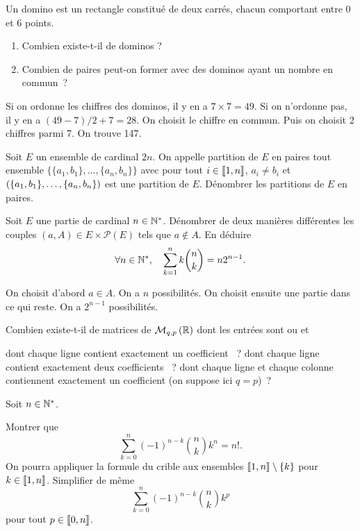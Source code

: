 \documentclass{magnolia}
\begin{document}
Un domino est un rectangle constitué de deux carrés, chacun comportant entre 0 et 6 points. 
\begin{enumerate}
\item Combien existe-t-il de dominos ?
\item Combien de paires peut-on former avec des dominos ayant un nombre en commun~?
\end{enumerate}
\begin{sol}
\begin{questions}
\question Si on ordonne les chiffres des dominos, il y en a $7\times 7=49$. Si on n'ordonne pas, il y en a $(49-7)/2+7=28$.
\question On choisit le chiffre en commun. Puis on choisit 2 chiffres parmi 7. On trouve 147.
\end{questions}
\end{sol}


Soit $E$ un ensemble de cardinal $2n$. On appelle partition de $E$ en paires tout ensemble 
$\{ \{a_1,b_1 \}, \dots, \{ a_n, b_n \} \}$ avec pour tout $i \in \left\llbracket 1,n\right\rrbracket$, 
$a_i \neq b_i$ et $\left(\{a_1,b_1 \}, \dots, \{ a_n, b_n \}\right)$ est une partition de $E$.
Dénombrer les  partitions de $E$ en paires.


Soit $E$ une partie de cardinal $n\in{\mathbb{N}^*}$. Dénombrer de deux manières différentes les couples
$(a,A)\in E\times\mathcal{P}(E)$ tels que $a\notin A$. En déduire
\[\forall n\in{\mathbb{N}^*} ,\quad \sum_{k=1}^n k \binom{n}{k}=n 2^{n-1}.\]
\begin{sol}
On choisit d'abord $a\in A$. On a $n$ possibilités. On choisit ensuite une partie dans ce qui reste. On a $2^{n-1}$ possibilités.

\end{sol}

Combien existe-t-il de matrices de $\mathcal{M}_{q,p}\left(\mathbb{R}\right)$ dont les entrées sont
 \fg ou  \fg et
\begin{questions}
\question dont chaque ligne contient exactement un coefficient  \fg ~?
\question dont chaque ligne contient exactement deux coefficients  \fg ~?
\question dont chaque ligne et chaque colonne contiennent exactement un
  coefficient  \fg (on suppose ici $q=p$)~?
\end{questions}

Soit $n\in{\mathbb{N}^*}$.
\begin{questions}
\question Montrer que
  \[\sum_{k=0}^n (-1)^{n-k}\binom{n}{k}k^n = n!.\]
  On pourra appliquer la formule du crible aux ensembles
  $\left\llbracket 1,n\right\rrbracket\setminus\left\{k\right\}$ pour $k\in\left\llbracket 1,n\right\rrbracket$.
\question Simplifier de même
  \[\sum_{k=0}^n (-1)^{n-k}\binom{n}{k}k^p\]
  pour tout $p\in\left\llbracket 0,n\right\rrbracket$.
\end{questions}
\end{document}
